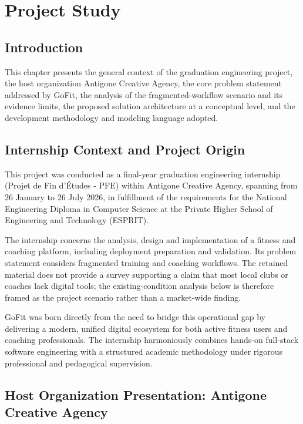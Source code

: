 \documentclass[12pt,a4paper,openany]{report}
\begin{document}
\chapter{Project Study}


\section*{Introduction}

This chapter presents the general context of the graduation engineering project, the host organization Antigone Creative Agency, the core problem statement addressed by GoFit, the analysis of the fragmented-workflow scenario and its evidence limits, the proposed solution architecture at a conceptual level, and the development methodology and modeling language adopted.

\section{Internship Context and Project Origin}

This project was conducted as a final-year graduation engineering internship (Projet de Fin d'Études - PFE) within Antigone Creative Agency, spanning from 26 January to 26 July 2026, in fulfillment of the requirements for the National Engineering Diploma in Computer Science at the Private Higher School of Engineering and Technology (ESPRIT).


The internship concerns the analysis, design and implementation of a fitness and coaching platform, including deployment preparation and validation. Its problem statement considers fragmented training and coaching workflows. The retained material does not provide a survey supporting a claim that most local clubs or coaches lack digital tools; the existing-condition analysis below is therefore framed as the project scenario rather than a market-wide finding.


GoFit was born directly from the need to bridge this operational gap by delivering a modern, unified digital ecosystem for both active fitness users and coaching professionals. The internship harmoniously combines hands-on full-stack software engineering with a structured academic methodology under rigorous professional and pedagogical supervision.


\section{Host Organization Presentation: Antigone Creative Agency}
\end{document}
